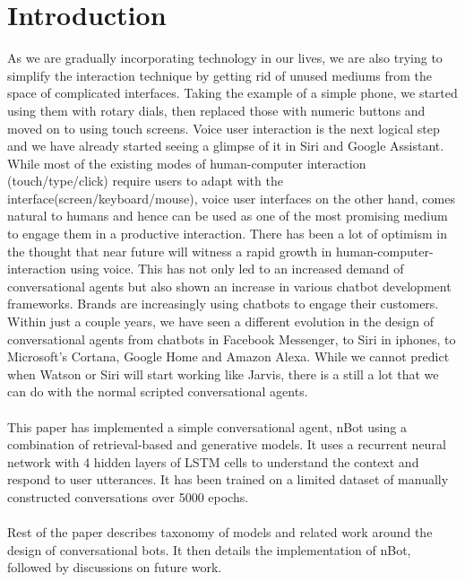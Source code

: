 \documentclass[letterpaper] {article} %
\begin{document}
\section{Introduction}
As we are gradually incorporating technology in our lives, we are also trying to simplify the interaction technique by getting rid of unused mediums from the space of complicated interfaces. Taking the example of a simple phone, we started using them with rotary dials, then replaced those with numeric buttons and moved on to using touch screens. Voice user interaction is the next logical step and we have already started seeing a glimpse of it in Siri and Google Assistant. While most of the existing modes of human-computer interaction (touch/type/click) require users to adapt with the interface(screen/keyboard/mouse), voice user interfaces on the other hand, comes natural to humans and hence can be used as one of the most promising medium to engage them in a productive interaction. There has been a lot of optimism in the thought that near future will witness a rapid growth in human-computer-interaction using voice. This has not only led to an increased demand of conversational agents but also shown an increase in various chatbot development frameworks. Brands are increasingly using chatbots to engage their customers. Within just a couple years, we have seen a different evolution in the design of conversational agents from chatbots in Facebook Messenger, to Siri in iphones, to Microsoft's Cortana, Google Home and Amazon Alexa. While we cannot predict when Watson or Siri will start working like Jarvis, there is a still a lot that we can do with the normal scripted conversational agents.\\\\
This paper has implemented a simple conversational agent, nBot using a combination of retrieval-based and generative models. It uses a recurrent neural network with 4 hidden layers of LSTM cells to understand the context and respond to user utterances. It has been trained on a limited dataset of manually constructed conversations over 5000 epochs.\\\\
Rest of the paper describes taxonomy of models and related work around the design of conversational bots.  It then details the implementation of nBot, followed by discussions on future work.
\end{document}
